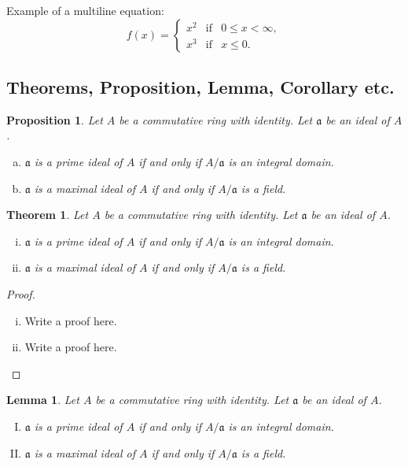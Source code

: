 \documentclass[11pt,leqno]{amsart}
\numberwithin{equation}{subsection}
\newtheorem{theorem}[equation]{Theorem}
\newtheorem{lemma}[equation]{Lemma}
\newtheorem{proposition}[equation]{Proposition}
\theoremstyle{definition}
\begin{document}
\noindent
Example of a multiline equation: 
\begin{equation}
f(x) = \left\{\begin{array}{rcl}
x^2 & \mbox{if} & 0 \leq x < \infty, \\ 
x^3 & \mbox{if} & x \leq 0. 
\end{array}\right. 
\end{equation}


\subsection{Theorems, Proposition, Lemma, Corollary etc.}

\begin{proposition}\label{prop-1}
	Let $A$ be a commutative ring with identity. Let $\mathfrak a$ be an ideal of $A$. 
	\begin{enumerate}[(a)]
		\item $\mathfrak a$ is a prime ideal of $A$ if and only if $A/\mathfrak a$ is an integral domain. 
		\item $\mathfrak a$ is a maximal ideal of $A$ if and only if $A/\mathfrak a$ is a field. 
	\end{enumerate}
\end{proposition}


\begin{theorem}
	Let $A$ be a commutative ring with identity. Let $\mathfrak a$ be an ideal of $A$. 
	\begin{enumerate}[(i)]
		\item $\mathfrak a$ is a prime ideal of $A$ if and only if $A/\mathfrak a$ is an integral domain. 
		\item $\mathfrak a$ is a maximal ideal of $A$ if and only if $A/\mathfrak a$ is a field. 
	\end{enumerate}
\end{theorem}

\begin{proof}
	\begin{enumerate}[(i)]
		\item Write a proof here. 
		
		\item Write a proof here. 
	\end{enumerate}
\end{proof}

\begin{lemma}
	Let $A$ be a commutative ring with identity. Let $\mathfrak a$ be an ideal of $A$. 
	\begin{enumerate}[(I)]
		\item $\mathfrak a$ is a prime ideal of $A$ if and only if $A/\mathfrak a$ is an integral domain. 
		\item $\mathfrak a$ is a maximal ideal of $A$ if and only if $A/\mathfrak a$ is a field. 
	\end{enumerate}
\end{lemma}
\end{document}

